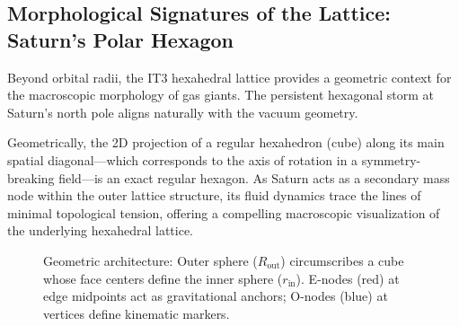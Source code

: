 \documentclass[11pt,a4paper]{article}
\theoremstyle{remark}
\newcommand{\AU}{\,\mathrm{AU}}
\begin{document}
\subsection{Morphological Signatures of the Lattice: Saturn's Polar Hexagon}

Beyond orbital radii, the IT3 hexahedral lattice provides a geometric context for the macroscopic morphology of gas giants. The persistent hexagonal storm at Saturn's north pole aligns naturally with the vacuum geometry.

Geometrically, the 2D projection of a regular hexahedron (cube) along its main spatial diagonal---which corresponds to the axis of rotation in a symmetry-breaking field---is an exact regular hexagon. As Saturn acts as a secondary mass node within the outer lattice structure, its fluid dynamics trace the lines of minimal topological tension, offering a compelling macroscopic visualization of the underlying hexahedral lattice.

\begin{figure}[htbp]
\centering
{}
\caption{Geometric architecture: Outer sphere ($R_{\text{out}}$) circumscribes a cube whose face centers define the inner sphere ($r_{\text{in}}$). E-nodes (red) at edge midpoints act as gravitational anchors; O-nodes (blue) at vertices define kinematic markers.}
\label{fig:geometry}
\end{figure}
\end{document}
